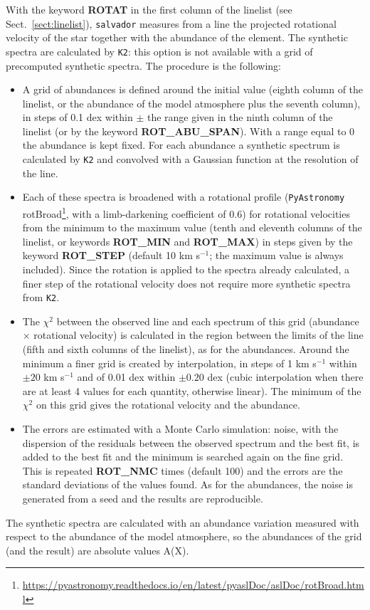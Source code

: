 \documentclass[modern]{aastex701}
\begin{document}
With the keyword {\bf ROTAT} in the first column of the linelist (see Sect.~\ref{sect:linelist}), \texttt{salvador} measures from a line the projected rotational velocity of the star together with the abundance of the element. The synthetic spectra are calculated by \texttt{K2}: this option is not available with a grid of precomputed synthetic spectra. The procedure is the following:
\begin{itemize}
    \item A grid of abundances is defined around the initial value (eighth column of the linelist, or the abundance of the model atmosphere plus the seventh column), in steps of 0.1 dex within $\pm$ the range given in the ninth column of the linelist (or by the keyword {\bf ROT\_ABU\_SPAN}). With a range equal to 0 the abundance is kept fixed. For each abundance a synthetic spectrum is calculated by \texttt{K2} and convolved with a Gaussian function at the resolution of the line.
    \item Each of these spectra is broadened with a rotational profile (\texttt{PyAstronomy} rotBroad\footnote{\url{https://pyastronomy.readthedocs.io/en/latest/pyaslDoc/aslDoc/rotBroad.html}}, with a limb-darkening coefficient of 0.6) for rotational velocities from the minimum to the maximum value (tenth and eleventh columns of the linelist, or keywords {\bf ROT\_MIN} and {\bf ROT\_MAX}) in steps given by the keyword {\bf ROT\_STEP} (default 10 km s$^{-1}$; the maximum value is always included). Since the rotation is applied to the spectra already calculated, a finer step of the rotational velocity does not require more synthetic spectra from \texttt{K2}.
    \item The $\chi^2$ between the observed line and each spectrum of this grid (abundance $\times$ rotational velocity) is calculated in the region between the limits of the line (fifth and sixth columns of the linelist), as for the abundances. Around the minimum a finer grid is created by interpolation, in steps of 1 km s$^{-1}$ within $\pm 20$ km s$^{-1}$ and of 0.01 dex within $\pm 0.20$ dex (cubic interpolation when there are at least 4 values for each quantity, otherwise linear). The minimum of the $\chi^2$ on this grid gives the rotational velocity and the abundance.
    \item The errors are estimated with a Monte Carlo simulation: noise, with the dispersion of the residuals between the observed spectrum and the best fit, is added to the best fit and the minimum is searched again on the fine grid. This is repeated {\bf ROT\_NMC} times (default 100) and the errors are the standard deviations of the values found. As for the abundances, the noise is generated from a seed and the results are reproducible.
\end{itemize}
The synthetic spectra are calculated with an abundance variation measured with respect to the abundance of the model atmosphere, so the abundances of the grid (and the result) are absolute values A(X). 
\end{document}
